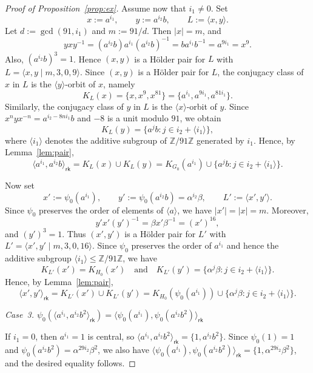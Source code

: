 \documentclass[10pt,a4paper]{amsart}
\begin{document}
\begin{proof}[Proof of Proposition~\ref{prop:ex}]
  Assume now that $i_1\neq 0$. Set
  $$ x:=a^{i_1},\qquad y:=a^{i_2}b,\qquad L:=\langle x,y\rangle. $$
  Let $d:=\gcd(91,i_1)$ and $m:=91/d$. Then $|x|=m$, and
  $$ yxy^{-1} = (a^{i_2}b)a^{i_1}(a^{i_2}b)^{-1} = ba^{i_1}b^{-1} = a^{9i_1} = x^9. $$
  Also, $(a^{i_2}b)^3=1$. Hence $(x,y)$ is a Hölder pair for $L$ with $L=\langle x,y\mid m,3,0,9\rangle$. Since $(x,y)$ is a Hölder pair for $L$, the conjugacy class of $x$ in $L$ is the
  $\langle y\rangle$-orbit of $x$, namely
  $$ K_L(x)=\{x,x^9,x^{81}\}=\{a^{i_1},a^{9i_1},a^{81i_1}\}. $$
  Similarly, the conjugacy class of $y$ in $L$ is the $\langle x\rangle$-orbit of $y$. Since $x^n y x^{-n}=a^{i_2-8n i_1}b$ and $-8$ is a unit modulo $91$, we obtain
  $$ K_L(y)=\{a^j b : j\in i_2+\langle i_1\rangle\}, $$
  where $\langle i_1\rangle$ denotes the additive subgroup of $\mathbb{Z}/91\mathbb{Z}$ generated by $i_1$. Hence, by Lemma~\ref{lem:pair},
  $$ \langle a^{i_1},a^{i_2}b\rangle_{\mathsf{rk}} = K_L(x)\cup K_L(y) = K_{G_0}(a^{i_1})\cup\{a^j b : j\in i_2+\langle i_1\rangle\}. $$
  
  Now set
  $$ x':=\psi_0(a^{i_1}),\qquad y':=\psi_0(a^{i_2}b)=\alpha^{i_2}\beta,\qquad L':=\langle x',y'\rangle. $$
  Since $\psi_0$ preserves the order of elements of $\langle a\rangle$, we have $|x'|=|x|=m$. Moreover,
  $$ y'x'(y')^{-1}=\beta x'\beta^{-1}=(x')^{16}, $$
  and $(y')^3=1$. Thus $(x',y')$ is a Hölder pair for $L'$ with $L'=\langle x',y'\mid m,3,0,16\rangle$. Since $\psi_0$ preserves the order of $a^{i_1}$ and hence the additive subgroup $\langle i_1\rangle\leq \mathbb{Z}/91\mathbb{Z}$, we have
  $$ K_{L'}(x')=K_{H_0}(x')\quad \text{and}\quad K_{L'}(y')=\{\alpha^j\beta : j\in i_2+\langle i_1\rangle\}. $$
  Hence, by Lemma~\ref{lem:pair},
  $$ \langle x',y'\rangle_{\mathsf{rk}} = K_{L'}(x')\cup K_{L'}(y') = K_{H_0}(\psi_0(a^{i_1}))\cup \{\alpha^j\beta : j\in i_2+\langle i_1\rangle\}. $$
  
  
  
  \medskip
  \noindent
  \emph{Case~3.\; $\psi_0(\langle a^{i_1},a^{i_2}b^2\rangle_{\mathsf{rk}})=\langle \psi_0(a^{i_1}),\psi_0(a^{i_2}b^2)\rangle_{\mathsf{rk}}$}
  
  \medskip
  If $i_1=0$, then $a^{i_1}=1$ is central, so $\langle a^{i_1},a^{i_2}b^2\rangle_{\mathsf{rk}}=\{1,a^{i_2}b^2\}$. Since $\psi_0(1)=1$ and $\psi_0(a^{i_2}b^2)=\alpha^{29i_2}\beta^2$, we also have $\langle \psi_0(a^{i_1}),\psi_0(a^{i_2}b^2)\rangle_{\mathsf{rk}}=\{1,\alpha^{29i_2}\beta^2\}$, and the desired equality follows.
  

\end{proof}
\end{document}
